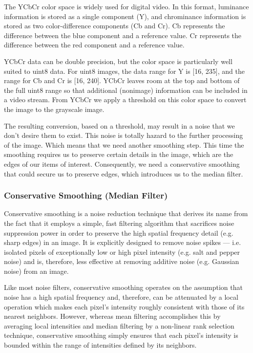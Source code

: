 \documentclass[12pt,fleqn]{book} %
\begin{document}
The YCbCr color space is widely used for digital video. In this format, luminance information is 
stored as a single component (Y), and chrominance information is stored as two color-difference 
components (Cb and Cr). Cb represents the difference between the blue component and a 
reference value. Cr represents the difference between the red component and a reference value. \bigskip


YCbCr data can be double precision, but the color space is particularly well suited 
to uint8 data. For uint8 images, the data range for Y is [16, 235], and the range for Cb and Cr is 
[16, 240]. YCbCr leaves room at the top and bottom of the full uint8 range so that additional 
(nonimage) information can be included in a video stream. From YCbCr we apply a threshold 
on this color space to convert the image to the grayscale image.\bigskip

The resulting conversion, based on a threshold, may result in a noise that we don’t desire them 
to exist. This noise is totally hazard to the further processing of the image. Which means that 
we need another smoothing step. This time the smoothing requires us to preserve certain details 
in the image, which are the edges of our items of interest. Consequently, we need a conservative 
smoothing that could secure us to preserve edges, which introduces us to the median filter.\bigskip

\subsubsection{Conservative Smoothing (Median Filter)} 
Conservative smoothing is a noise reduction technique that derives its name from the fact that it 
employs a simple, fast filtering algorithm that sacrifices noise suppression power in order to 
preserve the high spatial frequency detail (e.g. sharp edges) in an image. It is explicitly designed 
to remove noise spikes --- i.e. isolated pixels of exceptionally low or high pixel intensity (e.g. salt 
and pepper noise) and is, therefore, less effective at removing additive noise (e.g. Gaussian noise) 
from an image.  \bigskip

Like most noise filters, conservative smoothing operates on the assumption that noise has a 
high spatial frequency and, therefore, can be attenuated by a local operation which makes each 
pixel's intensity roughly consistent with those of its nearest neighbors. However, whereas mean 
filtering accomplishes this by averaging local intensities and median filtering by a non-linear 
rank selection technique, conservative smoothing simply ensures that each pixel's intensity is 
bounded within the range of intensities defined by its neighbors.  \bigskip
\end{document}
